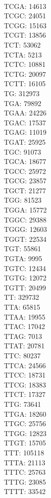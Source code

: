 \begin{multicols}{7}
\\ TCGA:	14613
\\ TCGC:	24051
\\ TCGG:	15163
\\ TCGT:	13856
\\ TCT:	53062
\\ TCTA:	5213
\\ TCTC:	10881
\\ TCTG:	20097
\\ TCTT:	16105
\\ TG:	312973
\\ TGA:	79892
\\ TGAA:	24226
\\ TGAC:	17537
\\ TGAG:	11019
\\ TGAT:	25925
\\ TGC:	91073
\\ TGCA:	18677
\\ TGCC:	25972
\\ TGCG:	23857
\\ TGCT:	21277
\\ TGG:	81523
\\ TGGA:	15772
\\ TGGC:	29388
\\ TGGG:	12603
\\ TGGT:	22534
\\ TGT:	55861
\\ TGTA:	9995
\\ TGTC:	12434
\\ TGTG:	12072
\\ TGTT:	20499
\\ TT:	329732
\\ TTA:	65815
\\ TTAA:	19955
\\ TTAC:	17042
\\ TTAG:	7013
\\ TTAT:	20781
\\ TTC:	80237
\\ TTCA:	24566
\\ TTCC:	18731
\\ TTCG:	18383
\\ TTCT:	17327
\\ TTG:	73641
\\ TTGA:	18260
\\ TTGC:	25756
\\ TTGG:	12823
\\ TTGT:	15705
\\ TTT:	105118
\\ TTTA:	21113
\\ TTTC:	25763
\\ TTTG:	23085
\\ TTTT:	33542
\end{multicols}